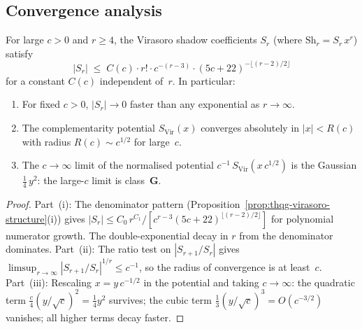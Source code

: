 
\subsection{Convergence analysis}
\label{subsec:thqg-convergence}

\begin{proposition}
\label{prop:thqg-coefficient-asymptotics}
\ClaimStatusProvedHere
{}
For large $c > 0$ and $r \geq 4$, the Virasoro shadow
coefficients $S_r$ (where $\mathrm{Sh}_r = S_r\,x^r$)
satisfy
\begin{equation}\label{eq:thqg-coefficient-bound}
|S_r|
\;\leq\;
C(c)\cdot r!\cdot c^{-(r-3)}\cdot(5c+22)^{-\lfloor(r-2)/2\rfloor}
\end{equation}
for a constant $C(c)$ independent of~$r$. In particular:
\begin{enumerate}[label=\textup{(\roman*)}]
\item For fixed $c > 0$, $|S_r| \to 0$ faster than any
 exponential as $r \to \infty$.
\item The complementarity potential
 $S_{\mathrm{Vir}}(x)$ converges absolutely in
 $|x| < R(c)$ with radius
 $R(c) \sim c^{1/2}$ for large~$c$.
\item The $c \to \infty$ limit of the normalised potential
 $c^{-1}\,S_{\mathrm{Vir}}(x\,c^{1/2})$ is the Gaussian
 $\frac{1}{4}\,y^2$: the large-$c$ limit is class~$\mathbf{G}$.
\end{enumerate}
\end{proposition}

\begin{proof}
Part~(i): The denominator pattern
(Proposition~\ref{prop:thqg-virasoro-structure}(i)) gives
$|S_r| \leq C_0\,r^{C_1}/[c^{r-3}(5c+22)^{\lfloor(r-2)/2\rfloor}]$
for polynomial numerator growth. The double-exponential
decay in $r$ from the denominator dominates.
Part~(ii): The ratio test on $|S_{r+1}/S_r|$ gives
$\limsup_{r\to\infty} |S_{r+1}/S_r|^{1/r} \leq c^{-1}$,
so the radius of convergence is at least~$c$.
Part~(iii): Rescaling $x = y\,c^{-1/2}$ in the potential
and taking $c \to \infty$: the quadratic term
$\frac{c}{4}(y/\sqrt{c})^2 = \frac{1}{4}y^2$ survives;
the cubic term $\frac{1}{3}(y/\sqrt{c})^3 = O(c^{-3/2})$
vanishes; all higher terms decay faster.
\end{proof}

